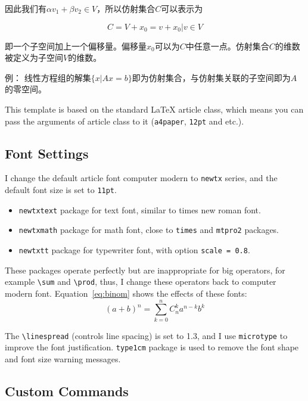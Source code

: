 \documentclass{elegantpaper}
\begin{document}
因此我们有$\alpha v_1 + \beta v_2 \in V$，所以仿射集合$C$可以表示为

\begin{equation}
	C = V + x_0 = {v + x_0 | v\in V}
\end{equation}

即一个子空间加上一个偏移量。偏移量$x_0$可以为$C$中任意一点。仿射集合$C$的维数被定义为子空间$V$的维数。

例： 线性方程组的解集$\{x|Ax=b\}$即为仿射集合，与仿射集关联的子空间即为$A$的零空间。

This template is based on the standard \LaTeX{} article class, which means you can pass the arguments of article class to it (\verb|a4paper|, \verb|12pt| and etc.).

\subsection{Font Settings}
I change the default article font computer modern to \verb|newtx| series, and the default font size is set to \verb|11pt|.

\begin{itemize}[noitemsep]
	\item \verb|newtxtext| package for text font, similar to times new roman font.
	\item \verb|newtxmath| package for math font, close to \verb|times| and \verb|mtpro2| packages.
	\item \verb|newtxtt| package for typewriter font, with option \verb|scale = 0.8|.
\end{itemize}

These packages operate perfectly but are inappropriate for big operators, for example \verb|\sum| and \verb|\prod|, thus, I change these operators back to computer modern font. Equation~\eqref{eq:binom} shows the effects of these fonts:
\begin{equation}
(a+b)^{n} = \sum_{k=0}^{n} C_{n}^{k} a^{n-k} b^k \label{eq:binom}
\end{equation}



The \verb|\linespread| (controls line spacing) is set to 1.3, and I use \verb|microtype| to improve the font justification. \verb|type1cm| package is used to remove the font shape and font size warning messages.

\subsection{Custom Commands}
\end{document}
